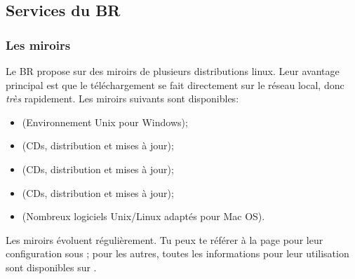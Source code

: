 \subsection{Services du BR}


\subsubsection{Les miroirs}
Le BR propose sur  des miroirs de plusieurs distributions linux. Leur avantage principal est que le téléchargement se fait directement sur le réseau local, donc \emph{très} rapidement.
Les miroirs suivants sont disponibles:

\begin{itemize}
\item {} (Environnement Unix pour Windows);
\item {} (CDs, distribution et mises à jour);
\item {} (CDs, distribution et mises à jour);
\item {} (CDs, distribution et mises à jour);
\item {} (Nombreux logiciels Unix/Linux adaptés pour Mac OS).
\end{itemize}



Les miroirs évoluent régulièrement. Tu peux te référer \`a la page \pageref{ubuntu_mirror} pour leur configuration sous  ; pour les autres, toutes les informations pour leur utilisation sont disponibles sur .
